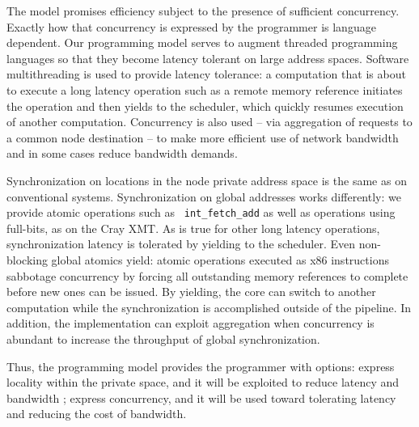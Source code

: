 \documentclass[10pt,nocopyrightspace,preprint]{sigplanconf}
\begin{document}
The model promises efficiency subject to the presence of sufficient
concurrency.  Exactly how that concurrency is expressed by the
programmer is language dependent.  Our programming model serves to
augment threaded programming languages so that they become latency
tolerant on large address spaces.  Software multithreading is used to
provide latency tolerance: a computation that is about to execute a
long latency operation such as a remote memory reference initiates the
operation and then yields to the scheduler, which quickly resumes
execution of another computation.  Concurrency is also used -- via
aggregation of requests to a common node destination -- to make more
efficient use of network bandwidth and in some cases reduce bandwidth
demands.

Synchronization on locations in the node private address space is the
same as on conventional systems.  Synchronization on global addresses
works differently: we provide atomic operations such as {\tt
  int\_fetch\_add} as well as operations using full-bits, as on the
Cray XMT.  As is true for other long latency operations,
synchronization latency is tolerated by yielding to the scheduler.
Even non-blocking global atomics yield: atomic operations executed as
x86 instructions sabbotage concurrency by forcing all outstanding
memory references to complete before new ones can be issued.  By
yielding, the core can switch to another computation while the
synchronization is accomplished outside of the pipeline.  In addition,
the implementation can exploit aggregation when concurrency is
abundant to increase the throughput of global synchronization.

Thus, the programming model provides the programmer with options: express
locality within the private space, and it will be exploited to reduce
latency and bandwidth ; express concurrency, and it will be used toward
tolerating latency and reducing the cost of bandwidth.
\end{document}
